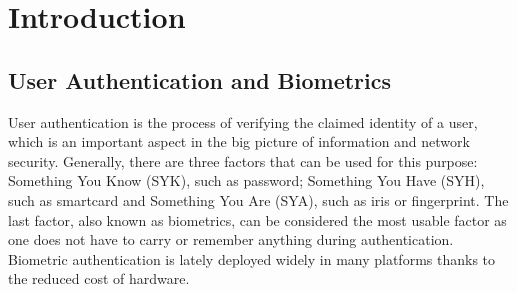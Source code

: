 
\chapter{Introduction}  %

\ifpdf
    \graphicspath{{Chapter1/Figs/Raster/}{Chapter1/Figs/PDF/}{Chapter1/Figs/}}
\else
    \graphicspath{{Chapter1/Figs/Vector/}{Chapter1/Figs/}}
\fi

\section{User Authentication and Biometrics}
\label{sec:biometricIntro}
User authentication is the process of verifying the claimed identity of a user,
which is an important aspect in the big picture of information and network
security. Generally, there are three factors that can be used for this purpose:
Something You Know (SYK), such as password; Something You Have (SYH), such as
smartcard and Something You Are (SYA), such as iris or fingerprint. The last
factor, also known as biometrics, can be considered the most usable factor as
one does not have to carry or remember anything during authentication.
Biometric authentication is lately deployed widely in many platforms thanks to
the reduced cost of hardware.

